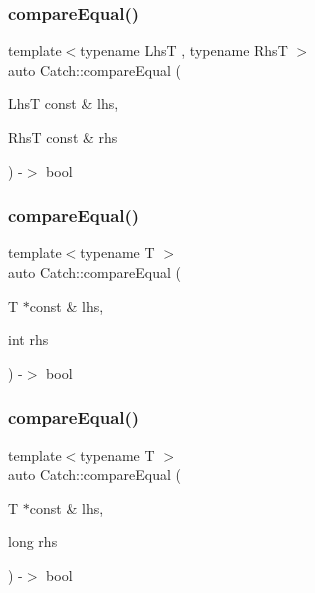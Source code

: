 \mbox{\label{namespace_catch_af89b8df30cfaf09abd048c6ff67359ee}} 
\subsubsection{\texorpdfstring{compare\+Equal()}{compareEqual()}\hspace{0.1cm}{\footnotesize\ttfamily [1/5]}}
{\footnotesize\ttfamily template$<$typename LhsT , typename RhsT $>$ \\
auto Catch\+::compare\+Equal (\begin{DoxyParamCaption}\item[{LhsT const \&}]{lhs,  }\item[{RhsT const \&}]{rhs }\end{DoxyParamCaption}) -\/$>$ bool }

\mbox{\label{namespace_catch_a68f451c45e65f242dde5f21c19a4cf7a}} 
\subsubsection{\texorpdfstring{compare\+Equal()}{compareEqual()}\hspace{0.1cm}{\footnotesize\ttfamily [2/5]}}
{\footnotesize\ttfamily template$<$typename T $>$ \\
auto Catch\+::compare\+Equal (\begin{DoxyParamCaption}\item[{T $\ast$const \&}]{lhs,  }\item[{int}]{rhs }\end{DoxyParamCaption}) -\/$>$ bool }

\mbox{\label{namespace_catch_afca4a005e1053c542462dc7a603b41b3}} 
\subsubsection{\texorpdfstring{compare\+Equal()}{compareEqual()}\hspace{0.1cm}{\footnotesize\ttfamily [3/5]}}
{\footnotesize\ttfamily template$<$typename T $>$ \\
auto Catch\+::compare\+Equal (\begin{DoxyParamCaption}\item[{T $\ast$const \&}]{lhs,  }\item[{long}]{rhs }\end{DoxyParamCaption}) -\/$>$ bool }

